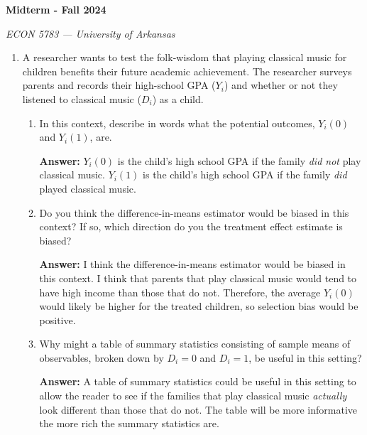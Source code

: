 \documentclass[12pt]{article}
\newcommand{\answer}[1]{{\color{blue_winged_teal}\textbf{Answer:} #1}}
\begin{document}
\begin{center}
  {\Huge\bf Midterm - Fall 2024}
  
  \smallskip
  {\large\it  ECON 5783 — University of Arkansas}
\end{center}

\medskip
\begin{enumerate}

  \item A researcher wants to test the folk-wisdom that playing classical music for children benefits their future academic achievement. The researcher surveys parents and records their high-school GPA ($Y_i$) and whether or not they listened to classical music ($D_i$) as a child.
  \begin{enumerate}
    \item In this context, describe in words what the potential outcomes, $Y_i(0)$ and $Y_i(1)$, are.
    
    \answer{
      $Y_i(0)$ is the child's high school GPA if the family \emph{did not} play classical music. $Y_i(1)$ is the child's high school GPA if the family \emph{did} played classical music. 
    }
    
    \item Do you think the difference-in-means estimator would be biased in this context? If so, which direction do you the treatment effect estimate is biased?
    
    \answer{
      I think the difference-in-means estimator would be biased in this context. I think that parents that play classical music would tend to have high income than those that do not. Therefore, the average $Y_i(0)$ would likely be higher for the treated children, so selection bias would be positive. 
    }
    
    \item Why might a table of summary statistics consisting of sample means of observables, broken down by $D_i = 0$ and $D_i = 1$, be useful in this setting?
    
    \answer{
      A table of summary statistics could be useful in this setting to allow the reader to see if the families that play classical music \emph{actually} look different than those that do not. The table will be more informative the more rich the summary statistics are.
    }
  \end{enumerate}


\end{enumerate}
\end{document}
